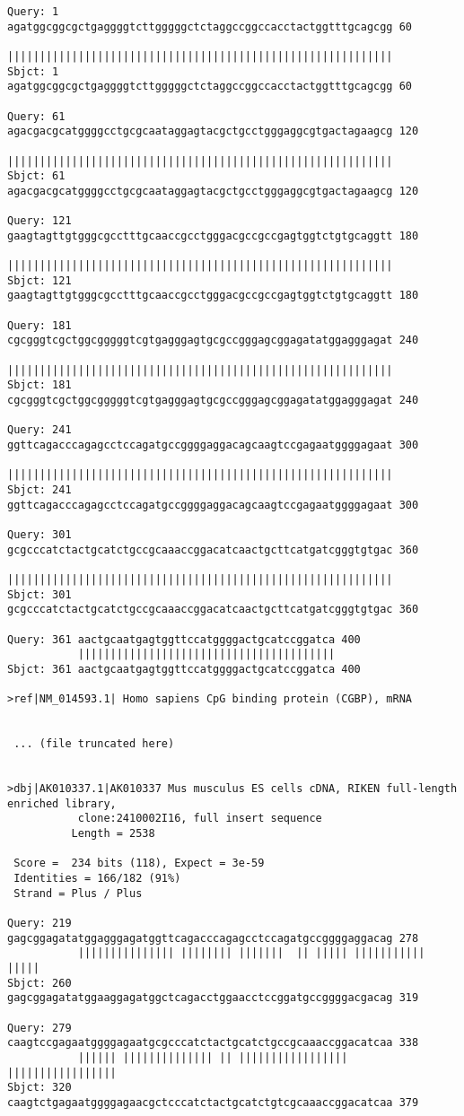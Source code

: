 \begin{lstlisting}
Query: 1   agatggcggcgctgaggggtcttgggggctctaggccggccacctactggtttgcagcgg 60
           ||||||||||||||||||||||||||||||||||||||||||||||||||||||||||||
Sbjct: 1   agatggcggcgctgaggggtcttgggggctctaggccggccacctactggtttgcagcgg 60

Query: 61  agacgacgcatggggcctgcgcaataggagtacgctgcctgggaggcgtgactagaagcg 120
           ||||||||||||||||||||||||||||||||||||||||||||||||||||||||||||
Sbjct: 61  agacgacgcatggggcctgcgcaataggagtacgctgcctgggaggcgtgactagaagcg 120

Query: 121 gaagtagttgtgggcgcctttgcaaccgcctgggacgccgccgagtggtctgtgcaggtt 180
           ||||||||||||||||||||||||||||||||||||||||||||||||||||||||||||
Sbjct: 121 gaagtagttgtgggcgcctttgcaaccgcctgggacgccgccgagtggtctgtgcaggtt 180

Query: 181 cgcgggtcgctggcgggggtcgtgagggagtgcgccgggagcggagatatggagggagat 240
           ||||||||||||||||||||||||||||||||||||||||||||||||||||||||||||
Sbjct: 181 cgcgggtcgctggcgggggtcgtgagggagtgcgccgggagcggagatatggagggagat 240

Query: 241 ggttcagacccagagcctccagatgccggggaggacagcaagtccgagaatggggagaat 300
           ||||||||||||||||||||||||||||||||||||||||||||||||||||||||||||
Sbjct: 241 ggttcagacccagagcctccagatgccggggaggacagcaagtccgagaatggggagaat 300

Query: 301 gcgcccatctactgcatctgccgcaaaccggacatcaactgcttcatgatcgggtgtgac 360
           ||||||||||||||||||||||||||||||||||||||||||||||||||||||||||||
Sbjct: 301 gcgcccatctactgcatctgccgcaaaccggacatcaactgcttcatgatcgggtgtgac 360

Query: 361 aactgcaatgagtggttccatggggactgcatccggatca 400
           ||||||||||||||||||||||||||||||||||||||||
Sbjct: 361 aactgcaatgagtggttccatggggactgcatccggatca 400

>ref|NM_014593.1| Homo sapiens CpG binding protein (CGBP), mRNA


 ... (file truncated here)


>dbj|AK010337.1|AK010337 Mus musculus ES cells cDNA, RIKEN full-length
enriched library,
           clone:2410002I16, full insert sequence
          Length = 2538

 Score =  234 bits (118), Expect = 3e-59
 Identities = 166/182 (91%)
 Strand = Plus / Plus

Query: 219 gagcggagatatggagggagatggttcagacccagagcctccagatgccggggaggacag 278
           ||||||||||||||| |||||||| |||||||  || ||||| ||||||||||| |||||
Sbjct: 260 gagcggagatatggaaggagatggctcagacctggaacctccggatgccggggacgacag 319

Query: 279 caagtccgagaatggggagaatgcgcccatctactgcatctgccgcaaaccggacatcaa 338
           |||||| |||||||||||||| || ||||||||||||||||| |||||||||||||||||
Sbjct: 320 caagtctgagaatggggagaacgctcccatctactgcatctgtcgcaaaccggacatcaa 379


\end{lstlisting}
